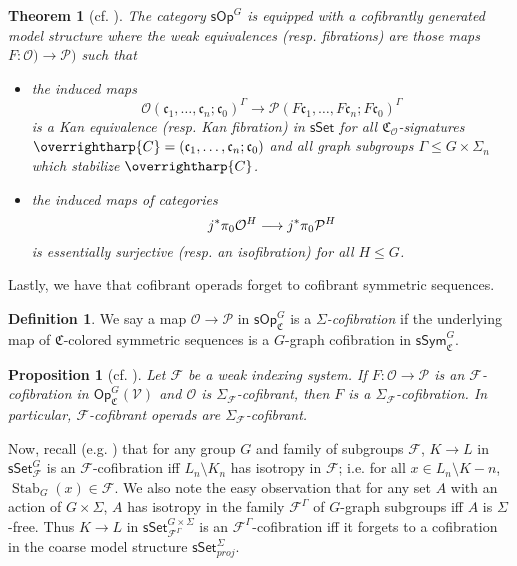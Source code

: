 \documentclass[a4paper,10pt
,draft
]{article}%
\numberwithin{equation}{section}
\numberwithin{figure}{section}
\newtheorem{theorem}[equation]{Theorem}%
\newtheorem{proposition}[equation]{Proposition}%
\theoremstyle{definition} %
\newtheorem{definition}[equation]{Definition}%
\newcommand{\longto}{\longrightarrow}%
\newcommand{\vect}[1]{\text{\overrightharp{\ensuremath{#1}}}}
\newcommand{\sSet}{\ensuremath{\mathsf{sSet}}}%
\newcommand{\Op}{\mathsf{Op}}%
\newcommand{\sOp}{\ensuremath{\mathsf{sOp}}}%
\newcommand{\sSym}{\ensuremath{\mathsf{sSym}}}%
\DeclareMathOperator{\Stab}{Stab}
\newcommand{\F}{\ensuremath{\mathcal F}}
\newcommand{\V}{\ensuremath{\mathcal V}}
\renewcommand{\O}{\ensuremath{\mathcal O}}
\renewcommand{\P}{\ensuremath{\mathcal P}}
\newcommand{\1}{\ensuremath{\mathbbm 1}}%
\begin{document}
\begin{theorem}[{cf. \cite[Thm. III, Prop. 4.78]{BP_HGOP}}] %
      The category $\sOp^G$ is equipped with a cofibrantly generated model structure where the weak equivalences (resp. fibrations) are those maps
      $F \colon \O) \to \P)$ such that
      \begin{itemize}
      \item the induced maps
            \begin{equation}
                  \label{DKEQUIV_EQ}
                  \O(\mathfrak c_1, \dots, \mathfrak c_n; \mathfrak c_0)^\Gamma \longto \P(F \mathfrak c_1, \dots, F \mathfrak c_n; F \mathfrak c_0)^\Gamma
            \end{equation}
            is a Kan equivalence (resp. Kan fibration) in $\sSet$
            for all $\mathfrak C_\O$-signatures $\vect C = (\mathfrak c_1, \dots, \mathfrak c_n; \mathfrak c_0)$
            and all \textit{graph subgroups} $\Gamma \leq G \times \Sigma_n$ which stabilize $\vect C$.
      \item the induced maps of categories
            \[
                  j^{\**}\pi_0 \O^H \longto j^{\**}\pi_0 \P^H
            \]
            is essentially surjective (resp. an isofibration) for all $H \leq G$.
      \end{itemize}
\end{theorem}


Lastly, we have that cofibrant operads forget to cofibrant symmetric sequences.
\begin{definition}
      We say a map $\O \to \P$ in $\sOp^G_{\mathfrak C}$ is a \textit{$\Sigma$-cofibration}
      if the underlying map of $\mathfrak C$-colored symmetric sequences is a $G$-graph cofibration in $\sSym_{\mathfrak C}^G$. 
\end{definition}

\begin{proposition}[{cf. \cite[Prop. 3.63]{BP_HGOP}}]
      \label{SIGMAG_COF PROP}
      Let $\F$ be a weak indexing system.
      If $F \colon \O \to \P$ is an $\F$-cofibration in $\Op^G_{\mathfrak C}(\V)$ and $\O$ is $\Sigma_\F$-cofibrant,
      then $F$ is a $\Sigma_\F$-cofibration.
      In particular, $\F$-cofibrant operads are $\Sigma_\F$-cofibrant.
\end{proposition}

Now, recall (e.g. \cite[Prop. 2.16]{Ste16}) that for any group $G$ and family of subgroups $\F$,
$K \to L$ in $\sSet^{G}_\F$ is an $\F$-cofibration iff $L_n \setminus K_n$ has isotropy in $\F$; i.e. for all $x \in L_n \setminus K-n$, $\Stab_{G}(x) \in \F$. 
% 
We also note the easy observation that for any set $A$ with an action of $G \times \Sigma$,
$A$ has isotropy in the family $\F^\Gamma$ of $G$-graph subgroups
iff
$A$ is $\Sigma$-free.
% 
Thus $K \to L$ in $\sSet^{G \times \Sigma}_{\F^\Gamma}$ is an $\F^\Gamma$-cofibration
iff
it forgets to a cofibration in the coarse model structure $\sSet^\Sigma_{proj}$.
\end{document}
